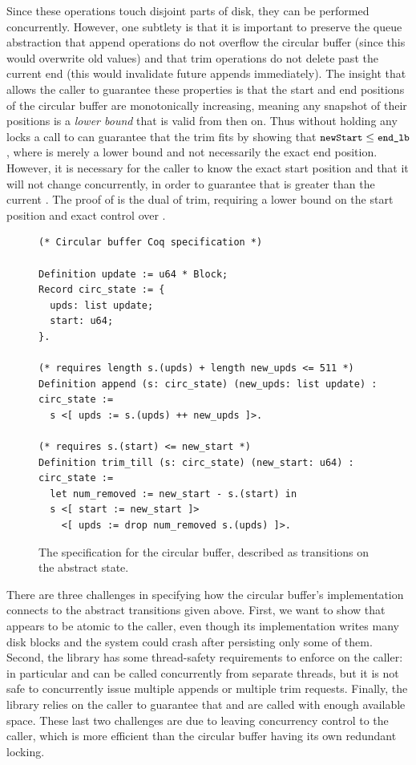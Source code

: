 Since these operations touch disjoint parts of disk, they can be performed
concurrently. However, one subtlety is that it is important to preserve the
queue abstraction that append operations do not overflow the circular buffer
(since this would overwrite old values) and that trim operations do not delete
past the current end (this would invalidate future appends immediately). The
insight that allows the caller to guarantee these properties is that the start
and end positions of the circular buffer are monotonically increasing, meaning
any snapshot of their positions is a \emph{lower bound} that is valid from then
on. Thus without holding any locks a call to  can
guarantee that the trim fits by showing that $\cc{newStart} \leq \cc{end_lb}$,
where  is merely a lower bound and not necessarily the exact end
position. However, it is necessary for the caller to know the exact start
position and that it will not change concurrently, in order to guarantee that
 is greater than the current . The proof of
 is the dual of trim, requiring a lower bound on the
start position and exact control over .

\begin{figure}[ht]
\begin{verbatim}
(* Circular buffer Coq specification *)

Definition update := u64 * Block;
Record circ_state := {
  upds: list update;
  start: u64;
}.

(* requires length s.(upds) + length new_upds <= 511 *)
Definition append (s: circ_state) (new_upds: list update) : circ_state :=
  s <[ upds := s.(upds) ++ new_upds ]>.

(* requires s.(start) <= new_start *)
Definition trim_till (s: circ_state) (new_start: u64) : circ_state :=
  let num_removed := new_start - s.(start) in
  s <[ start := new_start ]>
    <[ upds := drop num_removed s.(upds) ]>.
\end{verbatim}
  \tightenspace
  \caption[Specification for the circular buffer]%
  {The specification for the circular buffer, described as transitions
    on the abstract state.}
  \label{fig:circ:spec}
\end{figure}


There are three challenges in specifying how the circular buffer's
implementation connects to the abstract transitions given above. First, we
want to show that  appears to be atomic to the caller, even though
its implementation writes many disk blocks and the system could crash after
persisting only some of them. Second, the library has some thread-safety
requirements to enforce on the caller: in particular  and
 can be called concurrently from separate threads, but it is not
safe to concurrently issue multiple appends or multiple trim requests. Finally, the library
relies on the caller to guarantee that  and  are called with enough
available space. These last two challenges are due to leaving concurrency
control to the caller, which is more efficient than the circular buffer having
its own redundant locking.

